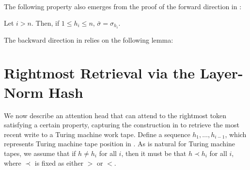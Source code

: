 The following property also emerges from the proof of the forward direction in :

\begin{lemma} \label{lem:input-tape-sigma}
    Let $i > n$. Then, if $1 \leq h_i \leq n$, $\bar \sigma = \sigma_{h_i}$.
\end{lemma}

The backward direction in  relies on the following lemma:



\section{Rightmost Retrieval via the Layer-Norm Hash} \label{sec:ranking-term}

We now describe an attention head that can attend to the rightmost token satisfying a certain property, capturing the construction in  to retrieve the most recent write to a Turing machine work tape.
Define a sequence $h_1, \ldots, h_{i-1}$, which represents Turing machine tape position in .
As is natural for Turing machine tapes, we assume that if $h \neq h_i$ for all $i$, then it must be that $h \prec h_i$ for all $i$, where $\prec$ is fixed as either $>$ or $<$.

